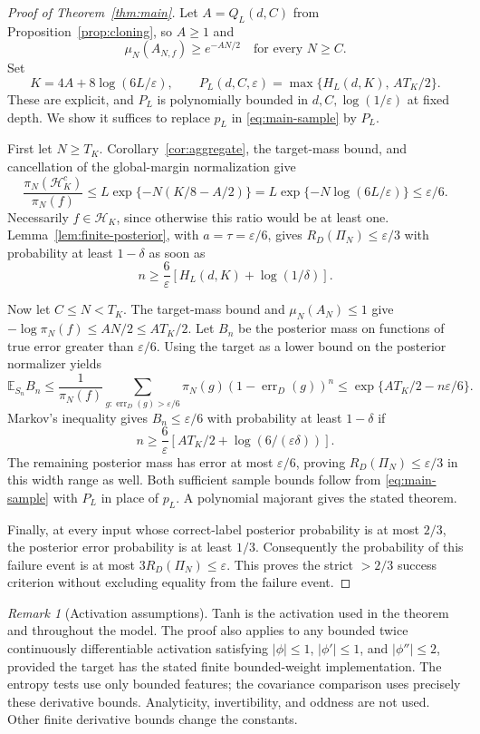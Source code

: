\documentclass[11pt]{article}
\theoremstyle{remark}\newtheorem{remark}[theorem]{Remark}
\newcommand{\E}{\mathbb E}\newcommand{\Prb}{\mathbb P}\renewcommand{\Pr}{\mathbb P}\newcommand{\R}{\mathbb R}
\begin{document}
\begin{proof}[Proof of Theorem~\ref{thm:main}]
Let $A=Q_L(d,C)$ from Proposition~\ref{prop:cloning}, so $A\geq1$ and
\[
 \mu_N(A_{N,f})\geq e^{-AN/2}\quad\text{for every }N\geq C.
\]
Set
\begin{equation}\label{eq:learning-budget}
 K=4A+8\log(6L/\varepsilon),
 \qquad
 P_L(d,C,\varepsilon)=
 \max\{H_L(d,K),\,A T_K/2\}.
\end{equation}
These are explicit, and $P_L$ is polynomially bounded in
$d,C,\log(1/\varepsilon)$ at fixed depth.
We show it suffices to replace $p_L$ in \eqref{eq:main-sample} by $P_L$.

First let $N\geq T_K$. Corollary~\ref{cor:aggregate}, the target-mass
bound, and cancellation of the global-margin normalization give
\[
 \frac{\pi_N(\mathcal H_K^c)}{\pi_N(f)}
 \leq L\exp\{-N(K/8-A/2)\}
 =L\exp\{-N\log(6L/\varepsilon)\}\leq\varepsilon/6.
\]
Necessarily $f\in\mathcal H_K$, since otherwise this ratio would be at
least one. Lemma~\ref{lem:finite-posterior}, with
$a=\tau=\varepsilon/6$, gives $R_D(\Pi_N)\leq\varepsilon/3$ with
probability at least $1-\delta$ as soon as
\[
 n\geq\frac6\varepsilon[H_L(d,K)+\log(1/\delta)].
\]

Now let $C\leq N<T_K$. The target-mass bound and $\mu_N(A_N)\leq1$
give $-\log\pi_N(f)\leq AN/2\leq A T_K/2$.
Let $B_n$ be the posterior mass on functions of true error greater than
$\varepsilon/6$. Using the target as a lower bound on the posterior
normalizer yields
\[
 \E_{S_n}B_n
 \leq\frac{1}{\pi_N(f)}
       \sum_{g:\operatorname{err}_D(g)>\varepsilon/6}
       \pi_N(g)(1-\operatorname{err}_D(g))^n
 \leq\exp\{A T_K/2-n\varepsilon/6\}.
\]
Markov's inequality gives $B_n\leq\varepsilon/6$ with probability at
least $1-\delta$ if
\[
 n\geq\frac6\varepsilon
       [A T_K/2+\log(6/(\varepsilon\delta))].
\]
The remaining posterior mass has error at most $\varepsilon/6$, proving
$R_D(\Pi_N)\leq\varepsilon/3$ in this width range as well.
Both sufficient sample bounds follow from \eqref{eq:main-sample} with
$P_L$ in place of $p_L$. A polynomial majorant gives the stated theorem.

Finally, at every input whose correct-label posterior probability is at
most $2/3$, the posterior error probability is at least $1/3$.
Consequently the probability of this failure event is at most
$3R_D(\Pi_N)\leq\varepsilon$. This proves the strict $>2/3$ success
criterion without excluding equality from the failure event.
\end{proof}

\begin{remark}[Activation assumptions]
Tanh is the activation used in the theorem and throughout the model.
The proof also applies to any bounded twice continuously differentiable
activation satisfying $|\phi|\leq1$, $|\phi'|\leq1$, and
$|\phi''|\leq2$, provided the target has the stated finite bounded-weight
implementation. The entropy tests use only bounded features; the covariance
comparison uses precisely these derivative bounds. Analyticity,
invertibility, and oddness are not used. Other finite derivative bounds
change the constants.
\end{remark}
\end{document}
